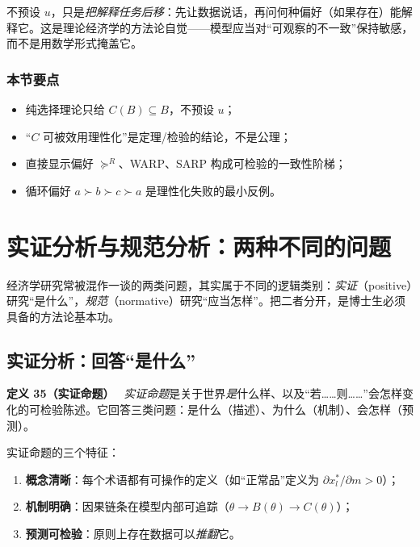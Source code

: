 不预设 $u$，只是\emph{把解释任务后移}：先让数据说话，再问何种偏好（如果存在）能解释它。这是理论经济学的方法论自觉——模型应当对“可观察的不一致”保持敏感，而不是用数学形式掩盖它。



\subsubsection*{本节要点}


\begin{itemize}
  \item 纯选择理论只给 $C(B)\subseteq B$，不预设 $u$；
  \item “$C$ 可被效用理性化”是定理/检验的结论，不是公理；
  \item 直接显示偏好 $\succeq^{R}$、WARP、SARP 构成可检验的一致性阶梯；
  \item 循环偏好 $a\succ b\succ c\succ a$ 是理性化失败的最小反例。
\end{itemize}

\section{实证分析与规范分析：两种不同的问题}

经济学研究常被混作一谈的两类问题，其实属于不同的逻辑类别：\emph{实证}（positive）研究“是什么”，\emph{规范}（normative）研究“应当怎样”。把二者分开，是博士生必须具备的方法论基本功。

\subsection{实证分析：回答“是什么”}



\textbf{定义 35}\textbf{（实证命题）}　
\emph{实证命题}是关于世界\emph{是}什么样、以及“若……则……”会怎样变化的可检验陈述。它回答三类问题：是什么（描述）、为什么（机制）、会怎样（预测）。




实证命题的三个特征：
\begin{enumerate}
  \item \textbf{概念清晰}：每个术语都有可操作的定义（如“正常品”定义为 $\partial x_l^{*}/\partial m>0$）；
  \item \textbf{机制明确}：因果链条在模型内部可追踪（$\theta\to B(\theta)\to C(\theta)$）；
  \item \textbf{预测可检验}：原则上存在数据可以\emph{推翻}它。
\end{enumerate}



